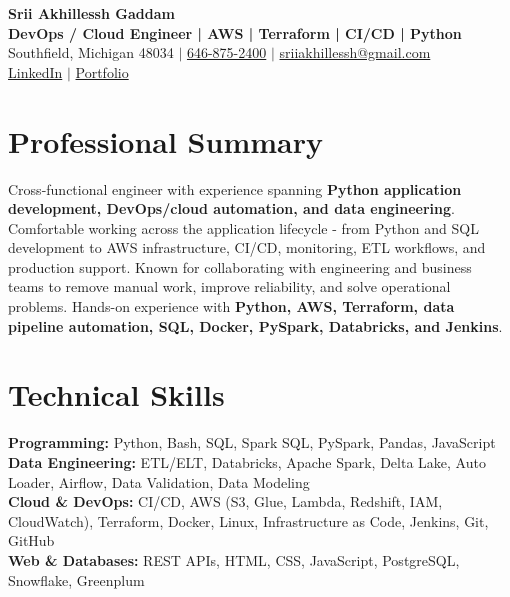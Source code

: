 \documentclass[letterpaper,10pt]{article}
\begin{document}
\fontsize{9.35pt}{10.45pt}\selectfont

\begin{center}
    {\LARGE \textbf{Srii Akhillessh Gaddam}} \\[-1pt]
    \textbf{DevOps / Cloud Engineer | AWS | Terraform | CI/CD | Python} \\[2pt]
    Southfield, Michigan 48034 $|$
    \href{tel:6468752400}{646-875-2400} $|$
    \href{mailto:sriiakhillessh@gmail.com}{sriiakhillessh@gmail.com} \\[1pt]
    \href{https://www.linkedin.com/in/srii-akhiilessh-gaddam-b48668191/}{LinkedIn} $|$
    \href{https://sriiakhillesshg.github.io/portfolio/}{Portfolio}
\end{center}
\vspace{-8pt}

\section{Professional Summary}
\small{Cross-functional engineer with experience spanning \textbf{Python application development, DevOps/cloud automation, and data engineering}. Comfortable working across the application lifecycle - from Python and SQL development to AWS infrastructure, CI/CD, monitoring, ETL workflows, and production support. Known for collaborating with engineering and business teams to remove manual work, improve reliability, and solve operational problems. Hands-on experience with \textbf{Python, AWS, Terraform, data pipeline automation, SQL, Docker, PySpark, Databricks, and Jenkins}.}

\section{Technical Skills}
\small{
\textbf{Programming:} Python, Bash, SQL, Spark SQL, PySpark, Pandas, JavaScript \\
\textbf{Data Engineering:} ETL/ELT, Databricks, Apache Spark, Delta Lake, Auto Loader, Airflow, Data Validation, Data Modeling \\
\textbf{Cloud \& DevOps:} CI/CD, AWS (S3, Glue, Lambda, Redshift, IAM, CloudWatch), Terraform, Docker, Linux, Infrastructure as Code, Jenkins, Git, GitHub \\
\textbf{Web \& Databases:} REST APIs, HTML, CSS, JavaScript, PostgreSQL, Snowflake, Greenplum
}
\end{document}
